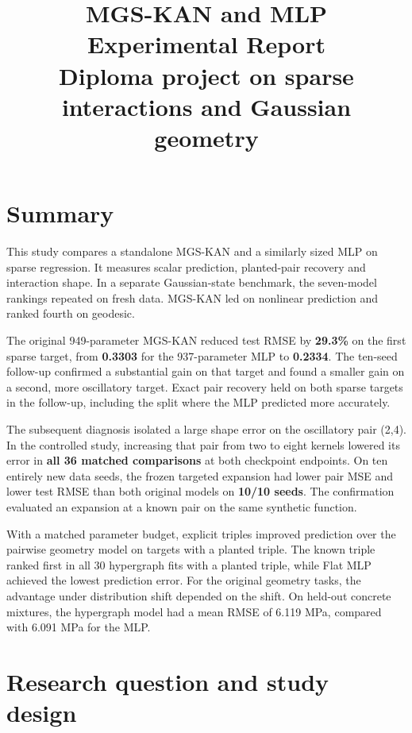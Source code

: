\documentclass[11pt]{article}
\title{MGS-KAN and MLP Experimental Report\\[.5ex]
       \large Diploma project on sparse interactions and Gaussian geometry}
\author{}
\date{}
\numberwithin{equation}{section}
\begin{document}
\maketitle


\section{Summary}

This study compares a standalone MGS-KAN and a similarly sized MLP on sparse regression. It
measures scalar prediction, planted-pair recovery and interaction shape. In a separate
Gaussian-state benchmark, the seven-model rankings repeated on fresh data. MGS-KAN led on
nonlinear prediction and ranked fourth on geodesic.

The original 949-parameter MGS-KAN reduced test RMSE by \textbf{29.3\%} on the first sparse
target, from \textbf{0.3303} for the 937-parameter MLP to \textbf{0.2334}. The ten-seed
follow-up confirmed a substantial gain on that target and found a smaller gain on a second,
more oscillatory target. Exact pair recovery held on both sparse targets in the follow-up,
including the split where the MLP predicted more accurately.

The subsequent diagnosis isolated a large shape error on the oscillatory pair (2,4). In the
controlled study, increasing that pair from two to eight kernels lowered its error in
\textbf{all 36 matched comparisons} at both checkpoint endpoints. On ten entirely new data
seeds, the frozen targeted expansion had lower pair MSE and lower test RMSE than both original
models on \textbf{10/10 seeds}. The confirmation evaluated an expansion at a known pair on the
same synthetic function.

With a matched parameter budget, explicit triples improved prediction over
the pairwise geometry model on targets with a planted triple. The known
triple ranked first in all 30 hypergraph fits with a planted triple,
while Flat MLP achieved the lowest
prediction error. For the original geometry tasks, the advantage under
distribution shift depended on the shift. On held-out concrete mixtures,
the hypergraph model had a mean RMSE of 6.119 MPa, compared with 6.091 MPa
for the MLP.

\tableofcontents

\section{Research question and study design}
\end{document}
